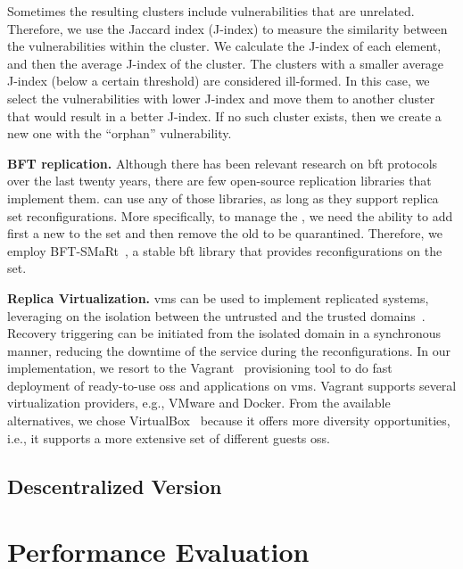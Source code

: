 Sometimes the resulting clusters include vulnerabilities that are unrelated. Therefore, we use the Jaccard index (J-index) to measure the similarity between the vulnerabilities within the cluster. We calculate the J-index of each element, and then the average J-index of the cluster. 
The clusters with a smaller average J-index (below a certain threshold) are considered ill-formed. In this case, we select the vulnerabilities with lower J-index and move them to another cluster that would result in a better J-index. If no such cluster exists, then we create a new one with the ``orphan'' vulnerability.

\textbf{BFT replication.}
Although there has been relevant research on \gls{bft} protocols over the last twenty years, there are few open-source replication libraries that implement them. \system can use any of those libraries, as long as they support replica set reconfigurations.
More specifically, to manage the \replicas, we need the ability to add first a new \replica to the set and then remove the old \replica to be quarantined. 
Therefore, we employ BFT-SMaRt~\cite{Bessani:2014}, a stable \gls{bft} library that provides reconfigurations on the \replicas set.

\textbf{Replica Virtualization.}
\glspl{vm} can be used to implement replicated systems, leveraging on the isolation between the untrusted and the trusted domains~\cite{Sousa:2010,Platania:2014,Distler:2011}.
Recovery triggering can be initiated from the isolated domain in a synchronous manner, reducing the downtime of the service during the reconfigurations. 
In our implementation, we resort to the Vagrant~\cite{vagrant} provisioning tool to do fast deployment of ready-to-use \glspl{os} and applications on \glspl{vm}. 
Vagrant supports several virtualization providers, e.g., VMware and Docker. 
From the available alternatives, we chose VirtualBox~\cite{virtualbox} because it offers more diversity opportunities, i.e., it supports a more extensive set of different guests \glspl{os}.

\subsection{Descentralized \system Version}

\section{Performance Evaluation}
\label{sec:overhead}

